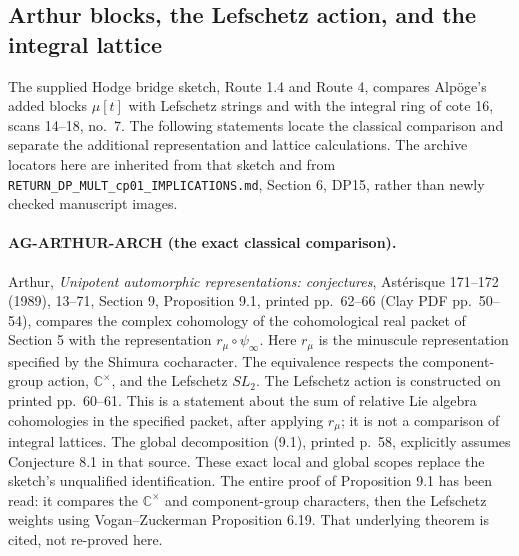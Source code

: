 \subsection{Arthur blocks, the Lefschetz action, and the integral lattice}
\label{ag:arthur}

The supplied Hodge bridge sketch, Route 1.4 and Route 4, compares
Alpöge's added blocks $\mu[t]$ with Lefschetz strings and with the
integral ring of cote 16, scans 14--18, no.~7. The following
statements locate the classical comparison and separate the
additional representation and lattice calculations. The archive
locators here are inherited from that sketch and from
\texttt{RETURN\_DP\_MULT\_cp01\_IMPLICATIONS.md}, Section 6,
DP15, rather than newly checked manuscript images.

\paragraph{AG-ARTHUR-ARCH (the exact classical comparison).}
Arthur, \emph{Unipotent automorphic representations: conjectures},
Astérisque 171--172 (1989), 13--71, Section 9,
Proposition 9.1, printed pp.~62--66 (Clay PDF pp.~50--54),
compares the complex cohomology of the cohomological real packet
of Section 5 with the representation $r_\mu\circ\psi_\infty$.
Here $r_\mu$ is the minuscule representation specified by the
Shimura cocharacter. The equivalence respects the component-group
action, $\mathbb C^\times$, and the Lefschetz $SL_2$.
The Lefschetz action is constructed on printed pp.~60--61.
This is a statement about the sum of relative Lie algebra
cohomologies in the specified packet, after applying $r_\mu$;
it is not a comparison of integral lattices. The global
decomposition (9.1), printed p.~58, explicitly assumes
Conjecture 8.1 in that source. These exact local and global
scopes replace the sketch's unqualified identification.
The entire proof of Proposition 9.1 has been read: it compares
the $\mathbb C^\times$ and component-group characters, then the
Lefschetz weights using Vogan--Zuckerman Proposition 6.19.
That underlying theorem is cited, not re-proved here.

